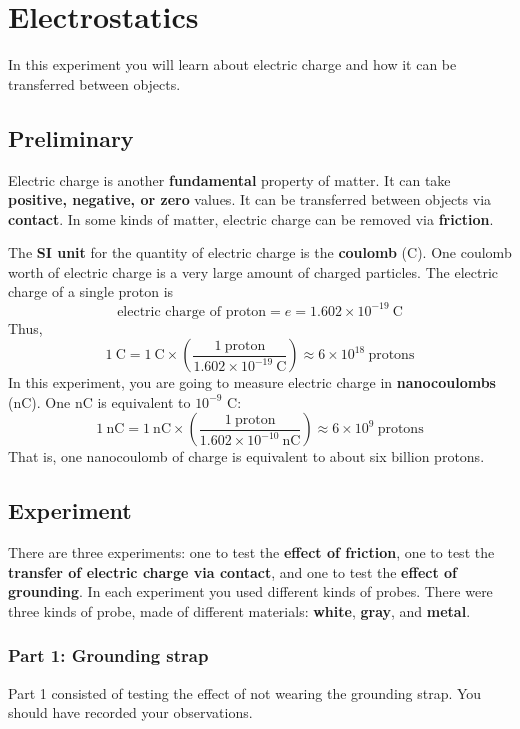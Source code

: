 \setcounter{chapter}{0}
\chapter{Electrostatics}
%
In this experiment you will learn about electric charge and how it can be transferred between objects.
%
\section{Preliminary}
%
Electric charge is another \textbf{fundamental} property of matter. It can take \textbf{positive, negative, or zero} values. It can be transferred between objects via \textbf{contact}. In some kinds of matter, electric charge can be removed via \textbf{friction}.

The \textbf{SI unit} for the quantity of electric charge is the \textbf{coulomb} (C). One coulomb worth of electric charge is a very large amount of charged particles. The electric charge of a single proton is
\begin{equation}
	\text{electric charge of proton} = e = 1.602 \times 10^{-19} \ \text{C}
\end{equation}
Thus,
\begin{equation}
	1 \ \text{C} = 1 \ \text{C} \times \left(\frac{1 \ \text{proton}}{1.602 \times 10^{-19} \ \text{C}}\right) \approx 6 \times 10^{18} \ \text{protons}
\end{equation}
In this experiment, you are going to measure electric charge in \textbf{nanocoulombs} (nC). One nC is equivalent to $10^{-9}$ C:
\begin{equation}
	1 \ \text{nC} = 1 \ \text{nC} \times \left(\frac{1 \ \text{proton}}{1.602 \times 10^{-10} \ \text{nC}}\right) \approx 6 \times 10^{9} \ \text{protons}
\end{equation}
That is, one nanocoulomb of charge is equivalent to about six billion protons.
%
\section{Experiment}
%
There are three experiments: one to test the \textbf{effect of friction}, one to test the \textbf{transfer of electric charge via contact}, and one to test the \textbf{effect of grounding}. In each experiment you used different kinds of probes. There were three kinds of probe, made of different materials: \textbf{white}, \textbf{gray}, and \textbf{metal}.
%
\subsection{Part 1: Grounding strap}
%
Part 1 consisted of testing the effect of not wearing the grounding strap. You should have recorded your observations.
%
